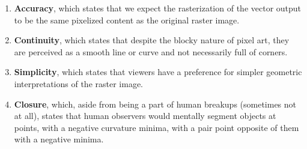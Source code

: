 \begin{enumerate}
	\item \textbf{Accuracy}, which states that we expect the rasterization of the vector output to be the same pixelized content as the original raster image.

    \item \textbf{Continuity}, which states that despite the blocky nature of pixel art, they are perceived as a smooth line or curve and not necessarily full of corners.

    \item \textbf{Simplicity}, which states that viewers have a preference for simpler geometric interpretations of the raster image.

    \item \textbf{Closure}, which, aside from being a part of human breakups (sometimes not at all), states that human observers would mentally segment objects at points, with a negative curvature minima, with a pair point opposite of them with a negative minima.
\end{enumerate}

